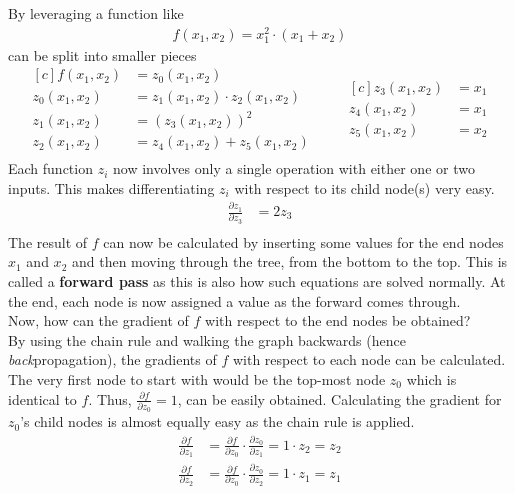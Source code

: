 By leveraging  a function like 
\begin{align}
    f(x_1, x_2) = x_1^2 \cdot (x_1 + x_2)
\end{align}
can be split into smaller pieces
\begin{equation*}
\begin{aligned}[c]
    f(x_1, x_2) & = z_0(x_1, x_2) \\
    z_0(x_1, x_2) & = z_1(x_1, x_2) \cdot z_2(x_1, x_2) \\
    z_1(x_1, x_2) & = (z_3(x_1, x_2))^2 \\
    z_2(x_1, x_2) & = z_4(x_1, x_2) + z_5(x_1, x_2) \\
\end{aligned}
\qquad
\begin{aligned}[c]
    z_3(x_1, x_2) & = x_1 \\
    z_4(x_1, x_2) & = x_1 \\
    z_5(x_1, x_2) & = x_2 \\
\end{aligned}
\end{equation*}
Each function $z_i$ now involves only a single operation with either one or two inputs.
This makes differentiating $z_i$ with respect to its child node(s) very easy.
\eg
\begin{align}
    \frac{\partial z_1}{\partial z_3} & = 2 z_3 \\
\end{align}
The result of $f$ can now be calculated by inserting some values for the end nodes $x_1$ and $x_2$ and then moving through the tree, from the bottom to the top.
This is called a \textbf{forward pass} as this is also how such equations are solved normally.
At the end, each node is now assigned a value as the forward comes through. \\
Now, how can the gradient of $f$ with respect to the end nodes be obtained? \\
By using the chain rule and walking the graph backwards (hence \textit{back}propagation), the gradients of $f$ with respect to each node can be calculated.
The very first node to start with would be the top-most node $z_0$ which is identical to $f$.
Thus,  $\frac{\partial f}{\partial z_0} = 1$, can be easily obtained.
Calculating the gradient for $z_0$'s child nodes is almost equally easy as the chain rule is applied.
\begin{align}
    \frac{\partial f}{\partial z_1} & = \frac{\partial f}{\partial z_0} \cdot \frac{\partial z_0}{\partial z_1} = 1 \cdot z_2 = z_2 \\
    \frac{\partial f}{\partial z_2} & = \frac{\partial f}{\partial z_0} \cdot \frac{\partial z_0}{\partial z_2} = 1 \cdot z_1 = z_1 \\
\end{align}
